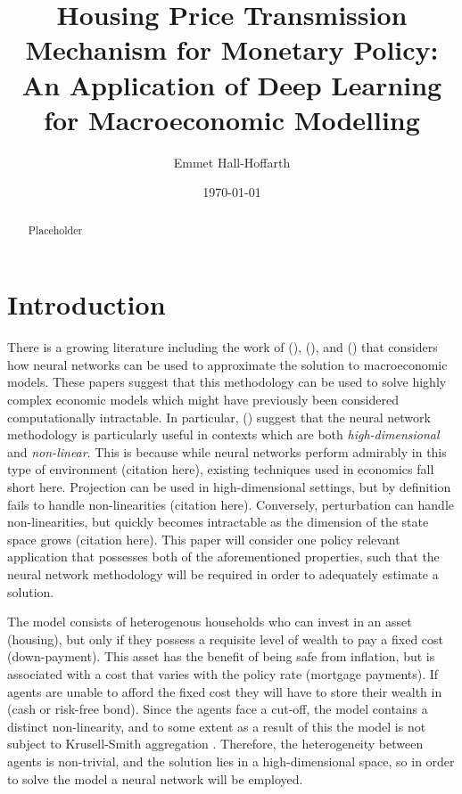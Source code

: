 \documentclass{article}
\title{Housing Price Transmission Mechanism for Monetary Policy: An Application of Deep Learning for Macroeconomic Modelling}
\author{Emmet Hall-Hoffarth}
\date{\today}
\begin{document}
\maketitle
    
\begin{abstract}

Placeholder

\end{abstract}


\section{Introduction}

There is a growing literature including the work of \citeauthor{duarte2018machine} (\citeyear{duarte2018machine}), \citeauthor{azinovic2019deep} (\citeyear{azinovic2019deep}), and \citeauthor{maliar2021deep} (\citeyear{maliar2021deep}) that considers how neural networks can be used to approximate the solution to macroeconomic models. These papers suggest that this methodology can be used to solve highly complex economic models which might have previously been considered computationally intractable. In particular, \citeauthor{han2021deepham} (\citeyear{han2021deepham}) suggest that the neural network methodology is particularly useful in contexts which are both \textit{high-dimensional} and \textit{non-linear}. This is because while neural networks perform admirably in this type of environment (citation here), existing techniques used in economics fall short here. Projection can be used in high-dimensional settings, but by definition fails to handle non-linearities (citation here). Conversely, perturbation can handle non-linearities, but quickly becomes intractable as the dimension of the state space grows (citation here). This paper will consider one policy relevant application that possesses both of the aforementioned properties, such that the neural network methodology will be required in order to adequately estimate a solution.

The model consists of heterogenous households who can invest in an asset (housing), but only if they possess a requisite level of wealth to pay a fixed cost (down-payment). This asset has the benefit of being safe from inflation, but is associated with a cost that varies with the policy rate (mortgage payments). If agents are unable to afford the fixed cost they will have to store their wealth in (cash or risk-free bond). Since the agents face a cut-off, the model contains a distinct non-linearity, and to some extent as a result of this the model is not subject to Krusell-Smith aggregation \parencite{krusell1998income}. Therefore, the heterogeneity between agents is non-trivial, and the solution lies in a high-dimensional space, so in order to solve the model a neural network will be employed. 
\end{document}

